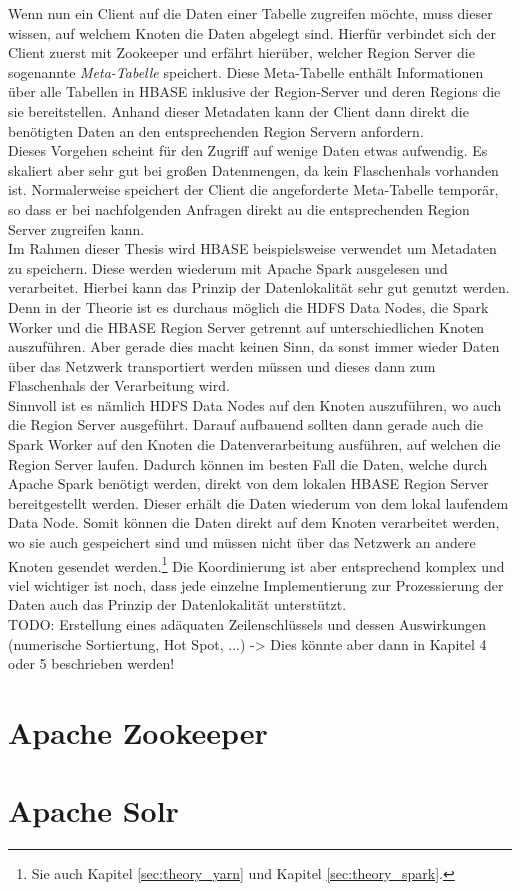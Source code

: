 \noindent
Wenn nun ein Client auf die Daten einer Tabelle zugreifen möchte, muss dieser wissen, auf welchem Knoten die Daten abgelegt sind. Hierfür verbindet sich der Client zuerst mit Zookeeper und erfährt hierüber, welcher Region Server die sogenannte \textit{Meta-Tabelle} speichert. Diese Meta-Tabelle enthält Informationen über alle Tabellen in HBASE inklusive der Region-Server und deren Regions die sie bereitstellen. Anhand dieser Metadaten kann der Client dann direkt die benötigten Daten an den entsprechenden Region Servern anfordern.\\
Dieses Vorgehen scheint für den Zugriff auf wenige Daten etwas aufwendig. Es skaliert aber sehr gut bei großen Datenmengen, da kein Flaschenhals vorhanden ist. Normalerweise speichert der Client die angeforderte Meta-Tabelle temporär, so dass er bei nachfolgenden Anfragen direkt au die entsprechenden Region Server zugreifen kann.\\ 

\noindent
Im Rahmen dieser Thesis wird HBASE beispielsweise verwendet um Metadaten zu speichern. Diese werden wiederum mit Apache Spark ausgelesen und verarbeitet. Hierbei kann das Prinzip der Datenlokalität sehr gut genutzt werden. Denn in der Theorie ist es durchaus möglich die HDFS Data Nodes, die Spark Worker und die HBASE Region Server getrennt auf unterschiedlichen Knoten auszuführen. Aber gerade dies macht keinen Sinn, da sonst immer wieder Daten über das Netzwerk transportiert werden müssen und dieses dann zum Flaschenhals der Verarbeitung wird.\\
Sinnvoll ist es nämlich HDFS Data Nodes auf den Knoten auszuführen, wo auch die Region Server ausgeführt. Darauf aufbauend sollten dann gerade auch die Spark Worker auf den Knoten die Datenverarbeitung ausführen, auf welchen die Region Server laufen. Dadurch können im besten Fall die Daten, welche durch Apache Spark benötigt werden, direkt von dem lokalen HBASE Region Server bereitgestellt werden. Dieser erhält die Daten wiederum von dem lokal laufendem Data Node. Somit können die Daten direkt auf dem Knoten verarbeitet werden, wo sie auch gespeichert sind und müssen nicht über das Netzwerk an andere Knoten gesendet werden.\footnote{Sie auch Kapitel \ref{sec:theory_yarn} und Kapitel \ref{sec:theory_spark}.} Die Koordinierung ist aber entsprechend komplex und viel wichtiger ist noch, dass jede einzelne Implementierung zur Prozessierung der Daten auch das Prinzip der Datenlokalität unterstützt.\\

\noindent
TODO: Erstellung eines adäquaten Zeilenschlüssels und dessen Auswirkungen (numerische Sortiertung, Hot Spot, ...) -> Dies könnte aber dann in Kapitel 4 oder 5 beschrieben werden!


\section{Apache Zookeeper}
\label{sec:theory_zookeeper}

\section{Apache Solr}
\label{sec:theory_solr}